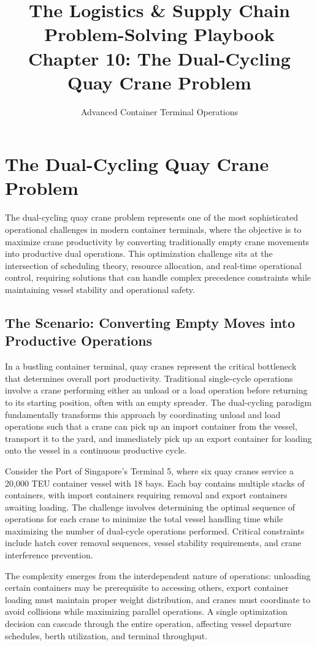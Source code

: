 \documentclass{article}
\title{The Logistics \& Supply Chain Problem-Solving Playbook\\
Chapter 10: The Dual-Cycling Quay Crane Problem}
\author{Advanced Container Terminal Operations}
\date{}
\begin{document}
\maketitle

\section{The Dual-Cycling Quay Crane Problem}

The dual-cycling quay crane problem represents one of the most sophisticated operational challenges in modern container terminals, where the objective is to maximize crane productivity by converting traditionally empty crane movements into productive dual operations. This optimization challenge sits at the intersection of scheduling theory, resource allocation, and real-time operational control, requiring solutions that can handle complex precedence constraints while maintaining vessel stability and operational safety.

\subsection{The Scenario: Converting Empty Moves into Productive Operations}

In a bustling container terminal, quay cranes represent the critical bottleneck that determines overall port productivity. Traditional single-cycle operations involve a crane performing either an unload or a load operation before returning to its starting position, often with an empty spreader. The dual-cycling paradigm fundamentally transforms this approach by coordinating unload and load operations such that a crane can pick up an import container from the vessel, transport it to the yard, and immediately pick up an export container for loading onto the vessel in a continuous productive cycle.

Consider the Port of Singapore's Terminal 5, where six quay cranes service a 20,000 TEU container vessel with 18 bays. Each bay contains multiple stacks of containers, with import containers requiring removal and export containers awaiting loading. The challenge involves determining the optimal sequence of operations for each crane to minimize the total vessel handling time while maximizing the number of dual-cycle operations performed. Critical constraints include hatch cover removal sequences, vessel stability requirements, and crane interference prevention.

The complexity emerges from the interdependent nature of operations: unloading certain containers may be prerequisite to accessing others, export container loading must maintain proper weight distribution, and cranes must coordinate to avoid collisions while maximizing parallel operations. A single optimization decision can cascade through the entire operation, affecting vessel departure schedules, berth utilization, and terminal throughput.
\end{document}
